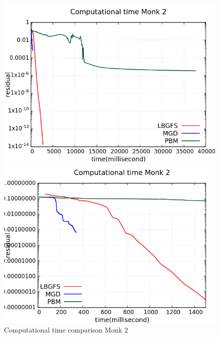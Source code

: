 \begin{figure}[H]
	\centering
	\begin{minipage}[t]{0.5\linewidth}
		\includegraphics[width=\linewidth]{data/Comparison/Monk2/Monk2_CT_Comparison_log_standard.png}
	\end{minipage}%
	\begin{minipage}[t]{0.5\linewidth}
		\includegraphics[width=\linewidth]{data/Comparison/Monk2/Monk2_CT_Comparison_log_zoom.png}
	\end{minipage}
	\caption{Computational time comparison Monk 2}
	\label{CT-Monk2}
\end{figure}
